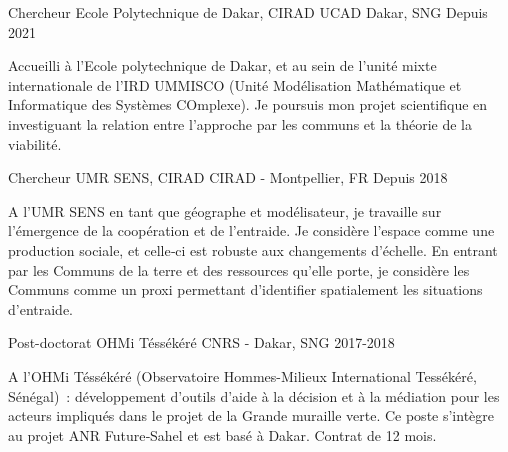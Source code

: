 

\begin{cventries}

\cventry
  {Chercheur} %
  {Ecole Polytechnique de Dakar, CIRAD} %
  {UCAD Dakar, SNG} %
  {Depuis 2021} %
  {
    \begin{cvitems} %
      Accueilli à l'Ecole polytechnique de Dakar, et au sein de l'unité mixte internationale de l'IRD UMMISCO (Unité Modélisation Mathématique et Informatique des Systèmes COmplexe). Je poursuis mon projet scientifique en investiguant la relation entre l'approche par les communs et la théorie de la viabilité.
    \end{cvitems}
  }


  \cventry
    {Chercheur} %
    {UMR SENS, CIRAD} %
    {CIRAD - Montpellier, FR} %
    {Depuis 2018} %
    {
      \begin{cvitems} %
        A l'UMR SENS en tant que géographe et modélisateur, je travaille sur l’émergence de la coopération et de l’entraide. Je considère l’espace comme une production sociale, et celle‑ci est robuste aux changements d’échelle. En entrant par les Communs de la terre et des ressources qu’elle porte, je considère les Communs comme un proxi permettant d’identifier spatialement les situations d’entraide.
      \end{cvitems}
    }


\cventry
  {Post-doctorat} %
  {OHMi Téssékéré} %
  {CNRS - Dakar, SNG} %
  {2017-2018} %
  {
    \begin{cvitems} %
      A l’OHMi Téssékéré (Observatoire Hommes-Milieux International Tessékéré, Sénégal) : développement d’outils d’aide à la décision et à la médiation pour les acteurs impliqués dans le projet de la Grande muraille verte. Ce poste s’intègre au projet ANR Future‑Sahel et est basé à Dakar. Contrat de 12 mois.
    \end{cvitems}
  }


\end{cventries}
